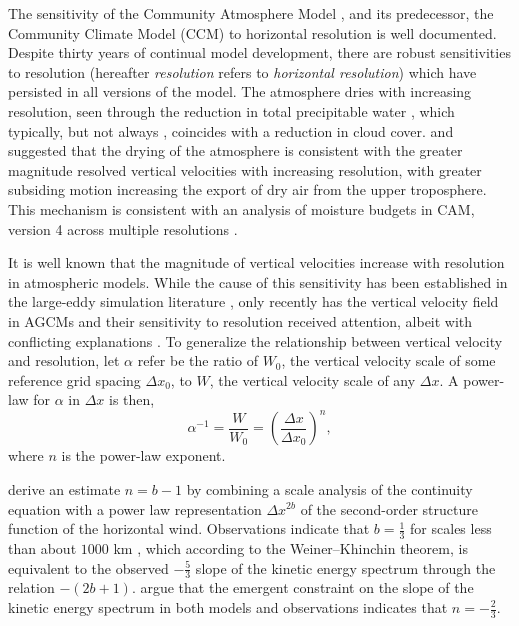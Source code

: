 \documentclass[times]{qjrms4}
\begin{document}
The sensitivity of the Community Atmosphere Model \citep[CAM;][]{CAM5}, and its predecessor, the Community Climate Model (CCM) to horizontal resolution is well documented. Despite thirty years of continual model development, there are robust sensitivities to resolution (hereafter {\em{resolution}} refers to {\em{horizontal resolution}}) which have persisted in all versions of the model. The atmosphere dries with increasing resolution, seen through the reduction in total precipitable water \citep{KW1991JGR,WETAL1995CD,W2008TELLUS,RETAL2013JCLIM,ZetAl2014JCb,HR2017JCLIM}, which typically, but not always \citep[see][]{WETAL1995CD,ZetAl2014JCb}, coincides with a reduction in cloud cover. \cite{KW1991JGR} and \cite{WETAL1995CD} suggested that the drying of the atmosphere is consistent with the greater magnitude resolved vertical velocities with increasing resolution, with greater subsiding motion increasing the export of dry air from the upper troposphere. This mechanism is consistent with an analysis of moisture budgets in CAM, version 4 \citep[CAM4;][]{CAM4} across multiple resolutions \citep{YETAL2014JCLIM,HR2017JCLIM}.

It is well known that the magnitude of vertical velocities increase with resolution in atmospheric models. While the cause of this sensitivity has been established in the large-eddy simulation literature \citep[see][and references therein]{J2017JAMES}, only recently has the vertical velocity field in AGCMs and their sensitivity to resolution received attention, albeit with conflicting explanations \citep{DETALA2016ACP,RETAL2016CD,HR2018JAMES}. To generalize the relationship between vertical velocity and resolution, let $\alpha$ refer be the ratio of $W_0$, the vertical velocity scale of some reference grid spacing $\Delta x_0$, to $W$, the vertical velocity scale of any $\Delta x$. A power-law for $\alpha$ in $\Delta x$ is then,
\begin{equation}
\alpha^{-1} = \frac{W}{W_0} = \left( \frac{\Delta x}{\Delta x_0} \right)^n, \label{eq:alpha}
\end{equation}
where $n$ is the power-law exponent. 

\cite{RETAL2016CD} derive an estimate $n= b-1$ by combining a scale analysis of the continuity equation with a power law representation $\Delta x^{2b}$ of the second-order structure function of the horizontal wind. Observations indicate that $b=\frac{1}{3}$ for scales less than about $1000$ km \citep{CETAL1999JGR}, which according to the Weiner–Khinchin theorem, is equivalent to the observed $-\frac{5}{3}$ slope of the kinetic energy spectrum  \citep{NG1985JAS} through the relation $-\left( 2b+1 \right) $. \cite{RETAL2016CD} argue that the emergent constraint on the slope of the kinetic energy spectrum in both models and observations indicates that $n= -\frac{2}{3}$.
\end{document}

